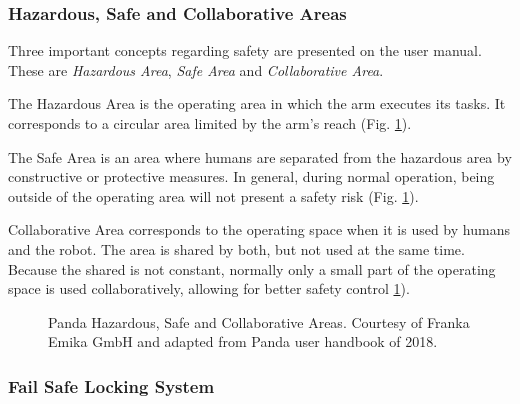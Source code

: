 
\subsubsection*{Hazardous, Safe and Collaborative Areas}
\label{subsubsec:robotic_system_operation_safety_hazardous_safe_collaborative_areas}

Three important concepts regarding safety are presented on the user manual. These are \textit{Hazardous Area}, \textit{Safe Area} and \textit{Collaborative Area}.

The Hazardous Area is the operating area in which the arm executes its tasks. It corresponds to a circular area limited by the arm's reach (Fig. \ref{fig:panda_hazardous_safe_collaborative_areas}).

The Safe Area is an area where humans are separated from the hazardous area by constructive or protective measures. In general, during normal operation, being outside of the operating area will not present a safety risk (Fig. \ref{fig:panda_hazardous_safe_collaborative_areas}).

Collaborative Area corresponds to the operating space when it is used by humans and the robot. The area is shared by both, but not used at the same time. Because the shared is not constant, normally only a small part of the operating space is used collaboratively, allowing for better safety control \ref{fig:panda_hazardous_safe_collaborative_areas}).\\

\begin{figure}[htbp]
    \centering
	\hspace{0.1in}
	\caption[Panda Hazardous, Safe and Collaborative Areas.]{Panda Hazardous, Safe and Collaborative Areas. Courtesy of Franka Emika GmbH and adapted from Panda user handbook of 2018.}
	\label{fig:panda_hazardous_safe_collaborative_areas}
\end{figure}


\subsubsection*{Fail Safe Locking System}
\label{subsubsec:robotic_system_operation_safety_fail_safe_locking_system}

